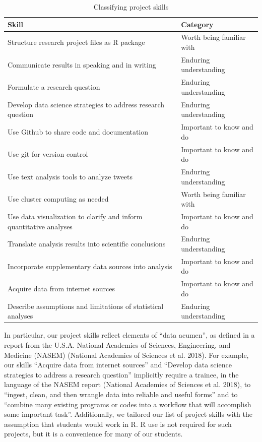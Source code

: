 \documentclass[
]{article}
\begin{document}
\begin{table}

\caption{\label{tab:circle-table}Classifying project skills}
\centering
\begin{tabular}[t]{|>{}l|>{}l|}
\hline
Skill & Category\\
\hline
Structure research project files as R package & Worth being familiar with\\
\hline
Communicate results in speaking and in writing & Enduring understanding\\
\hline
Formulate a research question & Enduring understanding\\
\hline
Develop data science strategies to address research question & Enduring understanding\\
\hline
Use Github to share code and documentation & Important to know and do\\
\hline
Use git for version control & Important to know and do\\
\hline
Use text analysis tools to analyze tweets & Enduring understanding\\
\hline
Use cluster computing as needed & Worth being familiar with\\
\hline
Use data visualization to clarify and inform quantitative analyses & Important to know and do\\
\hline
Translate analysis results into scientific conclusions & Enduring understanding\\
\hline
Incorporate supplementary data sources into analysis & Important to know and do\\
\hline
Acquire data from internet sources & Important to know and do\\
\hline
Describe assumptions and limitations of statistical analyses & Enduring understanding\\
\hline
\end{tabular}
\end{table}

In particular, our project skills reflect elements of ``data acumen'', as defined
in a report from the U.S.A. National Academies of Sciences, Engineering, and Medicine (NASEM) (National Academies of Sciences et al. 2018). For example, our skills ``Acquire data from internet sources'' and
``Develop data science strategies to address a research question'' implicitly require
a trainee, in the language of the NASEM report (National Academies of Sciences et al. 2018), to ``ingest, clean, and then
wrangle data into reliable and useful forms'' and to ``combine many existing programs or codes
into a workflow that will accomplish some important task''. Additionally, we tailored our list
of project skills with the assumption that students would work in R. R use is not required for such projects, but it is a
convenience for many of our students.
\end{document}
